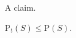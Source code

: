\documentclass{arxbj}
\newcommand{\prob}{\mathrm{P}}
\begin{document}
\begin{thm}A claim.\end{thm}
$\prob_t(S)\leq\prob(S)$.
\end{document}
